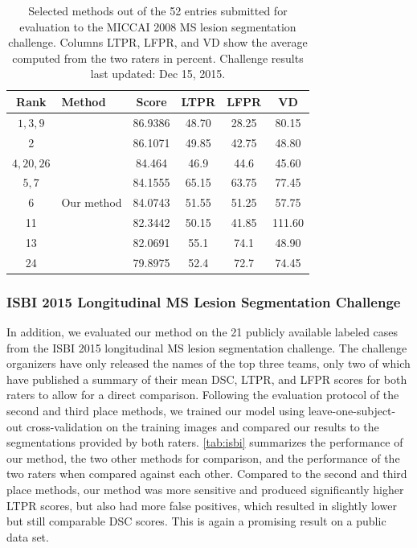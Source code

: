 \begin{table}[tb]
%
\caption[Selected methods out of the 52 entries submitted for evaluation to the
MICCAI 2008 MS lesion segmentation challenge]{Selected methods out of the 52
entries submitted for evaluation to the MICCAI 2008 MS lesion segmentation
challenge. Columns LTPR, LFPR, and VD show the average computed from the two
raters in percent. Challenge results last updated: Dec 15, 2015.}
\label{tab:miccai}
\centering
\begin{tabular}{@{}clS[table-format=2.2]
S[table-format=2.1,round-precision=1]
S[table-format=2.1,round-precision=1]
S[table-format=2.1,round-precision=1]@{}}
\toprule
Rank & Method & {Score} & {LTPR} & {LFPR} & {VD} \\
\midrule
$1,3,9$  & \citet{jesson2015} & 86.9386 & 48.70 & 28.25 & 80.15 \\
2  & \citet{guizard2015}   & 86.1071 & 49.85 & 42.75 & 48.80 \\
$4,20,26$  & \citet{tomas2015} & 84.464 & 46.9 & 44.6 &
45.60 \\
$5,7$ & \citet{jerman2015}        & 84.1555 & 65.15 & 63.75 & 77.45 \\
6  & Our method    & 84.0743 & 51.55 & 51.25 & 57.75 \\
11 & \citet{roura2015} & 82.3442 & 50.15 & 41.85 & 111.60 \\
13 & \citet{geremia2010}     & 82.0691 & 55.1 & 74.1 & 48.90 \\
24 & \citet{shiee2010topology} & 79.8975 & 52.4 & 72.7 & 74.45 \\
\bottomrule
\end{tabular}
\end{table}

\subsubsection{ISBI 2015 Longitudinal MS Lesion Segmentation Challenge}

In addition, we evaluated our method on the 21 publicly available labeled cases
from the ISBI 2015 longitudinal MS lesion segmentation challenge. The challenge
organizers have only released the names of the top three teams, only two of
which have published a summary of their mean DSC, LTPR, and LFPR scores for both
raters to allow for a direct comparison. Following the evaluation protocol of
the second \citep{jesson2015} and third \citep{maier2015} place methods, we
trained our model using leave-one-subject-out cross-validation on the training
images and compared our results to the segmentations provided by both raters.
\ref{tab:isbi} summarizes the performance of our method, the two other
methods for comparison, and the performance of the two raters when compared
against each other. Compared to the second and third place methods, our method
was more sensitive and produced significantly higher LTPR scores, but also had
more false positives, which resulted in slightly lower but still comparable DSC
scores. This is again a promising result on a public data set.

